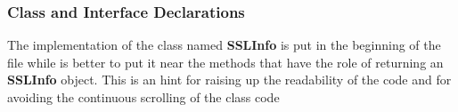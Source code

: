 \subsubsection{Class and Interface Declarations}
\begin{itemize}
		The implementation of the class named \textbf{SSLInfo} is put in the beginning of the file while is better to put it near the methods that have the role of returning an \textbf{SSLInfo} object.
		This is an hint for raising up the readability of the code and for avoiding the continuous scrolling of the class code
\end{itemize}

